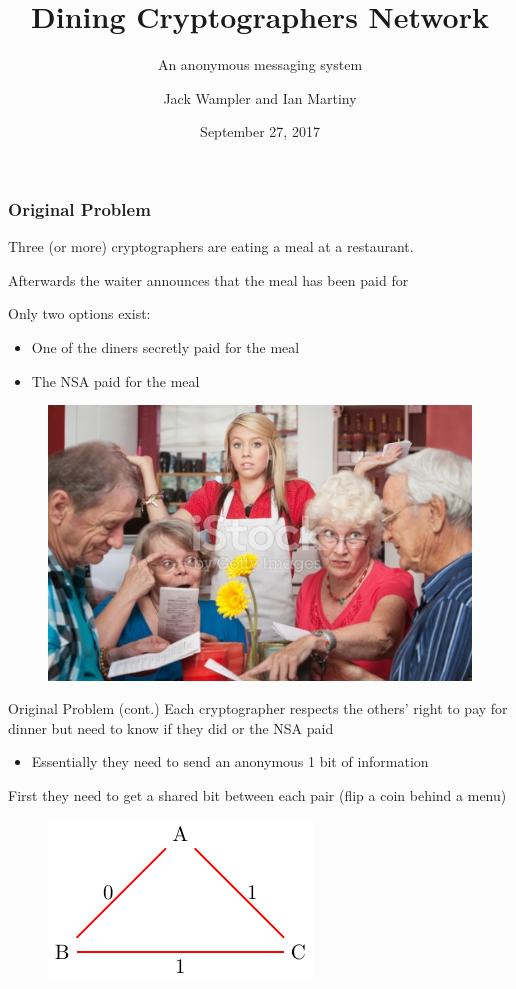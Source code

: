 \documentclass{beamer}
\title{Dining Cryptographers Network}
\subtitle{An anonymous messaging system}
\author{Jack Wampler and Ian Martiny}
\institute{University of Colorado---Boulder}
\date{September 27, 2017}
\begin{document}
 
\frame{\titlepage}
 
\begin{frame}
\frametitle{Original Problem}
Three (or more) cryptographers are eating a meal at a restaurant. 
\vspace{0.5cm}

Afterwards the waiter announces that the meal has been paid for\pause
\vspace{0.5cm}

Only two options exist:
\begin{itemize}
    \item One of the diners secretly paid for the meal
    \item The NSA paid for the meal
\end{itemize}
\begin{figure}
    \includegraphics[width=0.5\linewidth]{dining.jpg}
\end{figure}
\end{frame}

\begin{frame}{Original Problem (cont.)}
Each cryptographer respects the others' right to pay for dinner but need to know
if they did or the NSA paid
\begin{itemize}
    \item Essentially they need to send an anonymous 1 bit of information
\end{itemize}

First they need to get a shared bit between each pair (flip a coin behind a
menu)
\begin{figure}
    \includegraphics[width=0.5\linewidth]{DCTriangle.pdf}
\end{figure}
\end{frame}
\end{document}
